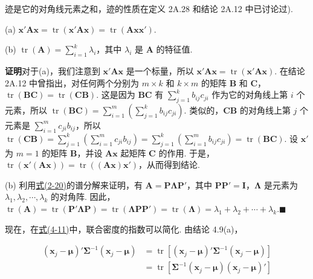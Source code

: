 迹是它的对角线元素之和，迹的性质在定义 2A.28 和结论 2A.12 中已讨论过).


(a) $\mathbf{x}'\mathbf{A}\mathbf{x}=\operatorname{tr}(\mathbf{x}'\mathbf{A}\mathbf{x})=\operatorname{tr}(\mathbf{A}\mathbf{x}\mathbf{x}')$.

(b) $\operatorname{tr}(\mathbf{A})=\sum\limits_{i=1}^{k}\lambda_i$，其中 $\lambda_i$ 是 $\mathbf{A}$ 的特征值.

\noindent\textbf{证明}\quad 对于(a)，我们注意到 $\mathbf{x}'\mathbf{A}\mathbf{x}$ 是一个标量，所以 $\mathbf{x}'\mathbf{A}\mathbf{x}=\operatorname{tr}(\mathbf{x}'\mathbf{A}\mathbf{x})$. 在结论 2A.12 中曾指出，对任何两个分别为 $m\times k$ 和 $k\times m$ 的矩阵 $\mathbf{B}$ 和 $\mathbf{C}$，$\operatorname{tr}(\mathbf{B}\mathbf{C})=\operatorname{tr}(\mathbf{C}\mathbf{B})$. 这是因为 $\mathbf{B}\mathbf{C}$ 有 $\sum\limits_{j=1}^{k}b_{ij}c_{ji}$ 作为它的对角线上第 $i$ 个元素，所以 $\operatorname{tr}(\mathbf{B}\mathbf{C})=\sum\limits_{i=1}^{m}\left(\sum\limits_{j=1}^{k}b_{ij}c_{ji}\right)$. 类似的，$\mathbf{C}\mathbf{B}$ 的对角线上第 $j$ 个元素是 $\sum\limits_{i=1}^{m}c_{ji}b_{ij}$，所以 $\operatorname{tr}(\mathbf{C}\mathbf{B})=\sum\limits_{j=1}^{k}\left(\sum\limits_{i=1}^{m}c_{ji}b_{ij}\right)=\sum\limits_{j=1}^{k}\left(\sum\limits_{i=1}^{m}b_{ij}c_{ji}\right)=\operatorname{tr}(\mathbf{B}\mathbf{C})$. 设 $\mathbf{x}'$ 为 $m=1$ 的矩阵 $\mathbf{B}$，并设 $\mathbf{A}\mathbf{x}$ 起矩阵 $\mathbf{C}$ 的作用. 于是，$\operatorname{tr}(\mathbf{x}'(\mathbf{A}\mathbf{x}))=\operatorname{tr}((\mathbf{A}\mathbf{x})\mathbf{x}')$，从而得到结论.

(b) 利用\hyperref[eq:2-20]{式(2-20)}的谱分解来证明，有 $\mathbf{A}=\mathbf{P}\boldsymbol{\Lambda}\mathbf{P}'$，其中 $\mathbf{P}\mathbf{P}'=\mathbf{I}$，$\boldsymbol{\Lambda}$ 是元素为 $\lambda_1,\lambda_2,\cdots,\lambda_k$ 的对角阵. 因此，$\operatorname{tr}(\mathbf{A})=\operatorname{tr}(\mathbf{P}'\boldsymbol{\Lambda}\mathbf{P})=\operatorname{tr}(\boldsymbol{\Lambda}\mathbf{P}\mathbf{P}')=\operatorname{tr}(\boldsymbol{\Lambda})=\lambda_1+\lambda_2+\cdots+\lambda_k$.\hfill$\blacksquare$

现在，在\hyperref[eq:4-11]{式(4-11)}中，联合密度的指数可以简化. 由结论 4.9(a)，

\label{eq:4-12}
\begin{equation}
\begin{aligned}
(\mathbf{x}_j-\boldsymbol{\mu})'\boldsymbol{\Sigma}^{-1}(\mathbf{x}_j-\boldsymbol{\mu})
&=\operatorname{tr}\left[(\mathbf{x}_j-\boldsymbol{\mu})'\boldsymbol{\Sigma}^{-1}(\mathbf{x}_j-\boldsymbol{\mu})\right]\\
&=\operatorname{tr}\left[\boldsymbol{\Sigma}^{-1}(\mathbf{x}_j-\boldsymbol{\mu})(\mathbf{x}_j-\boldsymbol{\mu})'\right]
\end{aligned}
\tag{4-12}
\end{equation}

